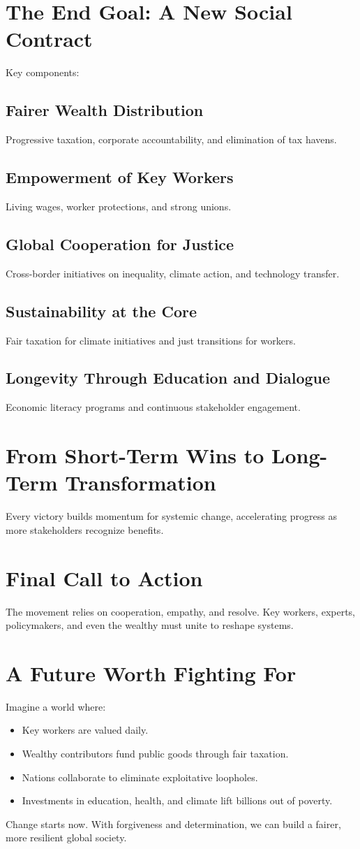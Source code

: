 \section{The End Goal: A New Social Contract}
Key components:
\subsection{Fairer Wealth Distribution}
Progressive taxation, corporate accountability, and elimination of tax havens.

\subsection{Empowerment of Key Workers}
Living wages, worker protections, and strong unions.

\subsection{Global Cooperation for Justice}
Cross-border initiatives on inequality, climate action, and technology transfer.

\subsection{Sustainability at the Core}
Fair taxation for climate initiatives and just transitions for workers.

\subsection{Longevity Through Education and Dialogue}
Economic literacy programs and continuous stakeholder engagement.

\section{From Short-Term Wins to Long-Term Transformation}
Every victory builds momentum for systemic change, accelerating progress as more stakeholders recognize benefits.

\section{Final Call to Action}
The movement relies on cooperation, empathy, and resolve. Key workers, experts, policymakers, and even the wealthy must unite to reshape systems.

\section{A Future Worth Fighting For}
Imagine a world where:
\begin{itemize}
  \item Key workers are valued daily.
  \item Wealthy contributors fund public goods through fair taxation.
  \item Nations collaborate to eliminate exploitative loopholes.
  \item Investments in education, health, and climate lift billions out of poverty.
\end{itemize}

Change starts now. With forgiveness and determination, we can build a fairer, more resilient global society.

\cleardoublepage
